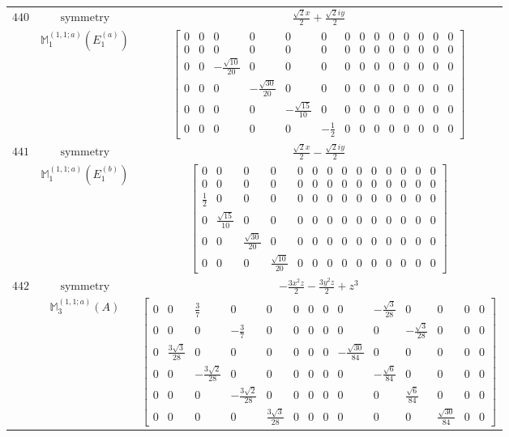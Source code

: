 \documentclass[fleqn,8pt,landscape]{jsarticle}
\begin{document}
\begin{longtable}{ccc}
$ 440 $ & $ \text{symmetry} $ & $ \frac{\sqrt{2} x}{2} + \frac{\sqrt{2} i y}{2} $ \\
$  $ & $ \mathbb{M}_{1}^{(1,1;a)}(E_{1}^{(a)}) $ & $ \begin{bmatrix} 0 & 0 & 0 & 0 & 0 & 0 & 0 & 0 & 0 & 0 & 0 & 0 & 0 & 0 \\ 0 & 0 & 0 & 0 & 0 & 0 & 0 & 0 & 0 & 0 & 0 & 0 & 0 & 0 \\ 0 & 0 & - \frac{\sqrt{10}}{20} & 0 & 0 & 0 & 0 & 0 & 0 & 0 & 0 & 0 & 0 & 0 \\ 0 & 0 & 0 & - \frac{\sqrt{30}}{20} & 0 & 0 & 0 & 0 & 0 & 0 & 0 & 0 & 0 & 0 \\ 0 & 0 & 0 & 0 & - \frac{\sqrt{15}}{10} & 0 & 0 & 0 & 0 & 0 & 0 & 0 & 0 & 0 \\ 0 & 0 & 0 & 0 & 0 & - \frac{1}{2} & 0 & 0 & 0 & 0 & 0 & 0 & 0 & 0 \end{bmatrix} $ \\ \hline
$ 441 $ & $ \text{symmetry} $ & $ \frac{\sqrt{2} x}{2} - \frac{\sqrt{2} i y}{2} $ \\
$  $ & $ \mathbb{M}_{1}^{(1,1;a)}(E_{1}^{(b)}) $ & $ \begin{bmatrix} 0 & 0 & 0 & 0 & 0 & 0 & 0 & 0 & 0 & 0 & 0 & 0 & 0 & 0 \\ 0 & 0 & 0 & 0 & 0 & 0 & 0 & 0 & 0 & 0 & 0 & 0 & 0 & 0 \\ \frac{1}{2} & 0 & 0 & 0 & 0 & 0 & 0 & 0 & 0 & 0 & 0 & 0 & 0 & 0 \\ 0 & \frac{\sqrt{15}}{10} & 0 & 0 & 0 & 0 & 0 & 0 & 0 & 0 & 0 & 0 & 0 & 0 \\ 0 & 0 & \frac{\sqrt{30}}{20} & 0 & 0 & 0 & 0 & 0 & 0 & 0 & 0 & 0 & 0 & 0 \\ 0 & 0 & 0 & \frac{\sqrt{10}}{20} & 0 & 0 & 0 & 0 & 0 & 0 & 0 & 0 & 0 & 0 \end{bmatrix} $ \\ \hline
$ 442 $ & $ \text{symmetry} $ & $ - \frac{3 x^{2} z}{2} - \frac{3 y^{2} z}{2} + z^{3} $ \\
$  $ & $ \mathbb{M}_{3}^{(1,1;a)}(A) $ & $ \begin{bmatrix} 0 & 0 & \frac{3}{7} & 0 & 0 & 0 & 0 & 0 & 0 & - \frac{\sqrt{3}}{28} & 0 & 0 & 0 & 0 \\ 0 & 0 & 0 & - \frac{3}{7} & 0 & 0 & 0 & 0 & 0 & 0 & - \frac{\sqrt{3}}{28} & 0 & 0 & 0 \\ 0 & \frac{3 \sqrt{3}}{28} & 0 & 0 & 0 & 0 & 0 & 0 & - \frac{\sqrt{30}}{84} & 0 & 0 & 0 & 0 & 0 \\ 0 & 0 & - \frac{3 \sqrt{2}}{28} & 0 & 0 & 0 & 0 & 0 & 0 & - \frac{\sqrt{6}}{84} & 0 & 0 & 0 & 0 \\ 0 & 0 & 0 & - \frac{3 \sqrt{2}}{28} & 0 & 0 & 0 & 0 & 0 & 0 & \frac{\sqrt{6}}{84} & 0 & 0 & 0 \\ 0 & 0 & 0 & 0 & \frac{3 \sqrt{3}}{28} & 0 & 0 & 0 & 0 & 0 & 0 & \frac{\sqrt{30}}{84} & 0 & 0 \end{bmatrix} $ \\ \hline

\end{longtable}
\end{document}
